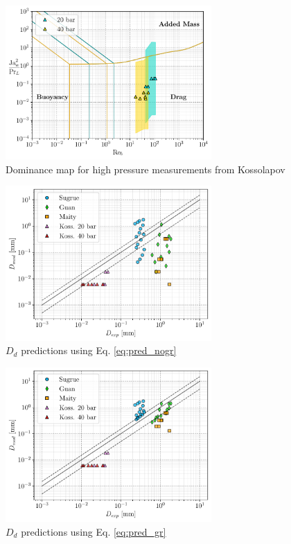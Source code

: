 \begin{figure}[h!]
\centering
\includegraphics[width=0.7\textwidth]{img/forces/kossmap_all.pdf}
\caption{Dominance map for high pressure measurements from Kossolapov}
\label{fig:highP_map}
\end{figure}




\begin{figure}[h!]
\centering
\includegraphics[width=0.7\textwidth]{img/forces/pred_nogr.pdf}
\caption{$D_{d}$ predictions using Eq. \ref{eq:pred_nogr}}
\label{fig:pred_nogr}
\end{figure}




\begin{figure}[h!]
\centering
\includegraphics[width=0.7\textwidth]{img/forces/pred_gr.pdf}
\caption{$D_{d}$ predictions using Eq. \ref{eq:pred_gr}}
\label{fig:pred_gr}
\end{figure}



